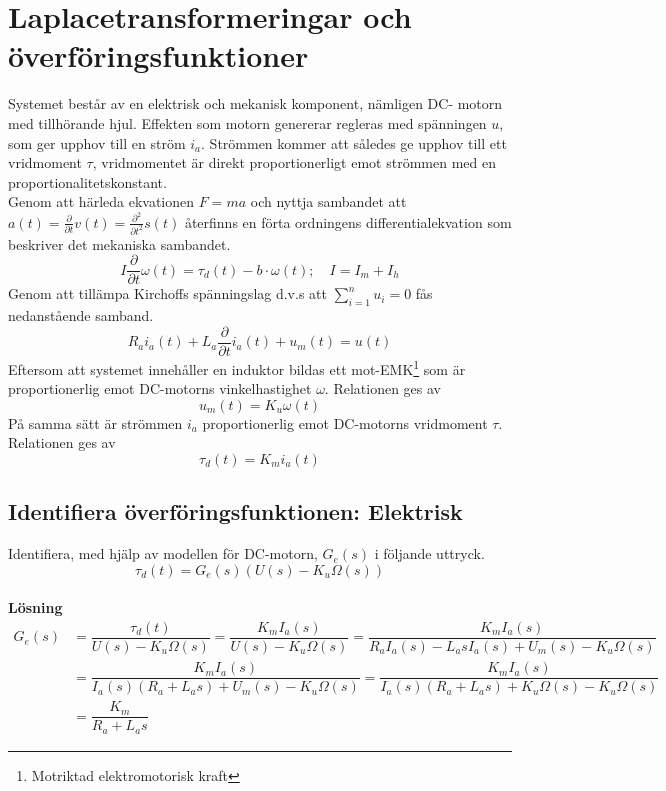 \documentclass[11pt]{article}
\begin{document}

\tableofcontents
\pagestyle{empty}
\newpage
\setcounter{page}{1}
\pagestyle{fancy}
\section{Laplacetransformeringar och överföringsfunktioner}
Systemet består av en elektrisk och mekanisk komponent, nämligen DC- motorn med tillhörande hjul. Effekten som motorn genererar regleras med spänningen $u$, som ger upphov till en ström $i_a$. Strömmen kommer att således ge upphov till ett vridmoment $\tau$, vridmomentet är direkt proportionerligt emot strömmen med en proportionalitetskonstant.
\\[2em]

Genom att härleda ekvationen $F=ma$ och nyttja sambandet att $a(t) = \frac{\partial}{\partial t}v(t) = \frac{\partial^2}{\partial t^2}s(t)$ återfinns en förta ordningens differentialekvation som beskriver det mekaniska sambandet.
\begin{equation}
I\dfrac{\partial}{\partial t}\omega(t) = \tau_d(t)-b\cdot\omega(t); \quad I = I_m +I_h
\end{equation}
Genom att tillämpa Kirchoffs spänningslag d.v.s att $\sum\limits_{i=1}^{n} u_i = 0$ fås nedanstående samband.
\begin{equation}
R_ai_a(t)+L_a\dfrac{\partial}{\partial t}i_a(t) + u_m(t) = u(t)
\end{equation}
Eftersom att systemet innehåller en induktor bildas ett mot-EMK\footnote{Motriktad elektromotorisk kraft} som är proportionerlig emot DC-motorns vinkelhastighet $\omega$. Relationen ges av
\begin{equation}
u_m(t) = K_u\omega(t)
\end{equation}
På samma sätt är strömmen $i_a$ proportionerlig emot DC-motorns vridmoment $\tau$. Relationen ges av
\begin{equation}
\tau_d(t) = K_mi_a(t)
\end{equation}
\subsection{Identifiera överföringsfunktionen: Elektrisk}
Identifiera, med hjälp av modellen för DC-motorn, $G_e(s)$ i följande uttryck.
$$\tau_d(t) = G_e(s)(U(s)-K_u\Omega(s))$$ \\[0.5em]
\textbf{Lösning}
\begin{equation*}
\begin{split}
G_e(s)&= \dfrac{\tau_d(t)}{U(s)-K_u\Omega(s)} =\dfrac{K_mI_a(s)}{U(s)-K_u\Omega(s)} = \dfrac{K_mI_a(s)}{R_aI_a(s)-L_asI_a(s)+U_m(s)-K_u\Omega(s)}\\
&=\dfrac{K_mI_a(s)}{I_a(s)(R_a+L_as)+U_m(s)-K_u\Omega(s)}= \dfrac{K_mI_a(s)}{I_a(s)(R_a+L_as)+K_u\Omega(s)-K_u\Omega(s)}\\
&=\dfrac{K_m}{R_a+L_as}
\end{split}
\end{equation*}
\newpage
\end{document}
